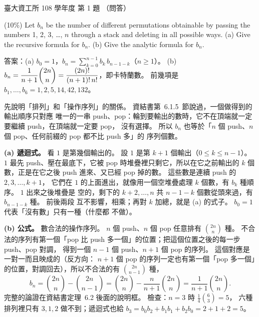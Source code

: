 \begin{pastexam}[label={px:ntu-108-dsaa-01}]{臺大資工所 108 學年度 第 1 題}
（問答）

(10\%) Let $b_n$ be the number of different permutations obtainable by passing the numbers 1, 2,
3, \ldots, $n$ through a stack and deleting in all possible ways. (a) Give the recursive formula
for $b_n$. (b) Give the analytic formula for $b_n$.
\end{pastexam}

\begin{pastsoln}
答案：(a) $b_0 = 1$，$b_n = \sum_{k=0}^{n-1} b_k\, b_{n-1-k}$（$n \ge 1$）。 (b) $b_n =
\dfrac{1}{n+1}\dbinom{2n}{n} = \dfrac{(2n)!}{(n+1)!\,n!}$，即卡特蘭數。 前幾項是
$b_1, \ldots, b_6 = 1, 2, 5, 14, 42, 132$。

先說明「排列」和「操作序列」的關係。 資結書第~6.1.5~節說過，一個做得到的輸出順序只對應
唯一的一串 push、pop：輪到要輸出的數時，它不在頂端就一定要繼續 push，在頂端就一定要 pop，
沒有選擇。 所以 $b_n$ 也等於「$n$ 個 push、$n$ 個 pop、任何前綴的 pop 都不比 push 多」的
序列個數。

\textbf{(a) 遞迴式。} 看 $1$ 是第幾個輸出的。 設 $1$ 是第 $k + 1$ 個輸出（$0 \le k \le
n - 1$）。 $1$ 最先 push、壓在最底下，它被 pop 時堆疊裡只剩它，所以在它之前輸出的 $k$ 個
數，正是在它之後 push 進來、又已經 pop 掉的數。 這些數是連續 push 的 $2, 3, \ldots, k + 1$，
它們在 $1$ 的上面進出，就像用一個空堆疊處理 $k$ 個數，有 $b_k$ 種順序。 $1$ 出來之後堆疊是
空的，剩下的 $k + 2, \ldots, n$ 共 $n - 1 - k$ 個數從頭來過，有 $b_{n-1-k}$ 種。 前後兩段
互不影響，相乘；再對 $k$ 加總，就是 (a) 的式子。 $b_0 = 1$ 代表「沒有數」只有一種（什麼都
不做）。

\textbf{(b) 公式。} 數合法的操作序列。 $n$ 個 push、$n$ 個 pop 任意排有 $\binom{2n}{n}$ 種。
不合法的序列有第一個「pop 比 push 多一個」的位置；把這個位置之後的每一步 push、pop 對調，
得到一個 $n - 1$ 個 push、$n + 1$ 個 pop 的序列。 這個對應是一對一而且映成的（反方向：
$n + 1$ 個 pop 的序列一定也有第一個「pop 多一個」的位置，對調回去），所以不合法的有
$\binom{2n}{n-1}$ 種，
\[
b_n = \binom{2n}{n} - \binom{2n}{n-1} = \binom{2n}{n} - \frac{n}{n+1}\binom{2n}{n}
= \frac{1}{n+1}\binom{2n}{n}.
\]
完整的論證在資結書定理~6.2 後面的說明框。 檢查：$n = 3$ 時 $\frac{1}{4}\binom{6}{3} = 5$，
六種排列裡只有 $3, 1, 2$ 做不到；遞迴式也給 $b_3 = b_0 b_2 + b_1 b_1 + b_2 b_0 = 2 + 1 + 2
= 5$。
\end{pastsoln}
